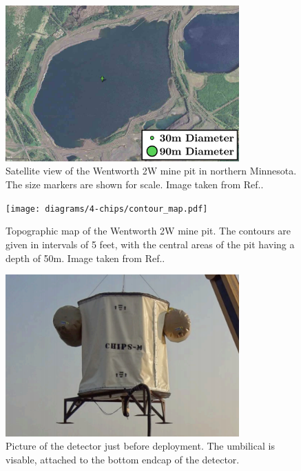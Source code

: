 \begin{figure} %
    \includegraphics[width=0.8\textwidth]{diagrams/4-chips/location.png}
    \caption[Satellite view of the Wentworth 2W mine pit.]
    {Satellite view of the Wentworth 2W mine pit in northern Minnesota.
        The size markers are shown for scale. Image taken from Ref.\cite{adamson2013}.}
    \label{fig:location}
\end{figure} %

\begin{figure} %
    \texttt{[image: diagrams/4-chips/contour\_map.pdf]}
    \caption[Topographic map of the Wentworth 2W mine pit.]
    {Topographic map of the Wentworth 2W mine pit. The contours are given in intervals of 5 feet,
        with the central areas of the pit having a depth of 50m. Image taken from Ref.\cite{adamson2013}.}
    \label{fig:contour_map}
\end{figure} %

\begin{figure} %
    \includegraphics[width=0.8\textwidth]{diagrams/4-chips/chips_m.png}
    \caption[Picture of the \chipsm detector.]
    {Picture of the \chipsm detector just before deployment. The umbilical is visable, attached to the
        bottom endcap of the detector.}
    \label{fig:chips_m}
\end{figure} %

